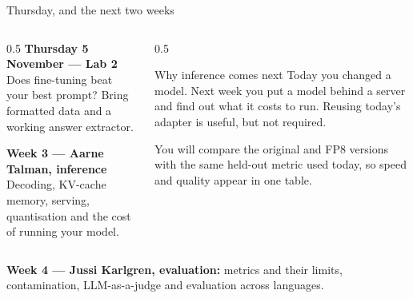 \documentclass[aspectratio=169,10pt]{beamer}
\begin{document}
\begin{frame}[shrink=3]{Thursday, and the next two weeks}
  \begin{columns}[T]
    \begin{column}{0.5\textwidth}
      \textbf{Thursday 5 November --- Lab 2}\\
      Does fine-tuning beat your best prompt? Bring formatted data and a
      working answer extractor.
      \vspace{0.8em}

      \textbf{Week 3 --- Aarne Talman, inference}\\
      Decoding, KV-cache memory, serving, quantisation and the cost of running
      your model.
    \end{column}
    \begin{column}{0.5\textwidth}
      \begin{block}{Why inference comes next}
        \small
        Today you changed a model. Next week you put a model behind a server
        and find out what it costs to run. Reusing today's adapter is useful,
        but not required.
        \vspace{0.4em}

        You will compare the original and FP8 versions with the same held-out
        metric used today, so speed and quality appear in one table.
      \end{block}
    \end{column}
  \end{columns}
  \vspace{0.4em}
  \raggedright
  \small
  \textbf{Week 4 --- Jussi Karlgren, evaluation:} metrics and their limits,
  contamination, LLM-as-a-judge and evaluation across languages.
\end{frame}

\appendix
\end{document}
